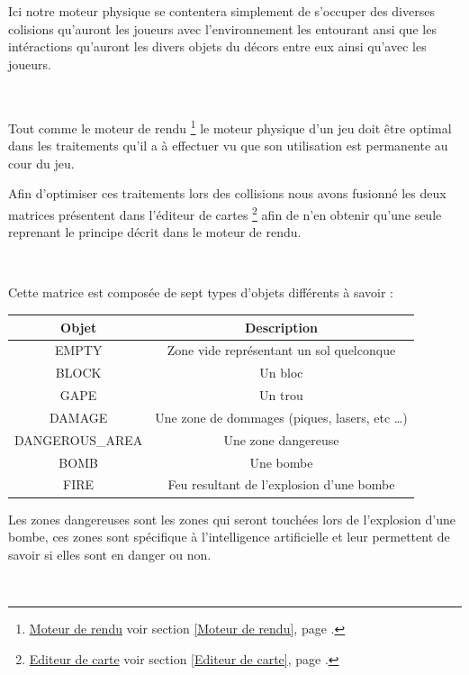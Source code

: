 			
			Ici notre moteur physique se contentera simplement de s'occuper des diverses
			colisions qu'auront les joueurs avec l'environnement les entourant ansi que
			les intéractions qu'auront les divers objets du décors entre eux ainsi qu'avec les joueurs.

			$\,$		
			
			Tout comme le moteur de rendu
			\footnote{
				\hyperlink{Moteur de rendu}{Moteur de rendu}
				\og voir section \ref{Moteur de rendu}, page \pageref{Moteur de rendu}.\fg
			}
			le moteur physique d'un jeu doit être optimal dans les traitements qu'il a à
			effectuer vu que son utilisation est permanente au cour du jeu.
			
			
			Afin d'optimiser ces traitements lors des collisions nous avons fusionné les
			deux matrices présentent dans l'éditeur de cartes
			\footnote{
				\hyperlink{Editeur de carte}{Editeur de carte}
				\og voir section \ref{Editeur de carte}, page \pageref{Editeur de carte}.\fg
			}
			afin de n'en obtenir qu'une seule reprenant le principe décrit dans le moteur
			de rendu\footnotemark[2].
			
			$\,$
			
			Cette matrice est composée de sept types d'objets différents à savoir :
			
			\begin{center}
				\begin{tabular}{|c|c|} \hline
				Objet  & Description \\\hline
				EMPTY  & Zone vide représentant un sol quelconque\\\hline
				BLOCK  & Un bloc \\\hline
				GAPE   & Un trou \\\hline
				DAMAGE & Une zone de dommages (piques, lasers, etc \ldots) \\\hline
				DANGEROUS\_AREA & Une zone dangereuse\\\hline
				BOMB & Une bombe\\\hline
				FIRE & Feu resultant de l'explosion d'une bombe\\\hline
				\end{tabular}
			\end{center}
			
			Les zones dangereuses sont les zones qui seront touchées lors de l'explosion
			d'une bombe, ces zones sont spécifique à l'intelligence artificielle et leur
			permettent de savoir si elles sont en danger ou non.
			
			
			$\,$
			
